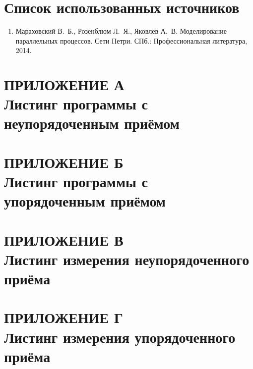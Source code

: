 \documentclass[14pt,a4paper]{extarticle}
\begin{document}
\section{Список использованных источников}

\begin{enumerate}[label=\arabic*,leftmargin=1.25cm]
    \item Мараховский В.~Б., Розенблюм Л.~Я., Яковлев А.~В.
    Моделирование параллельных процессов. Сети Петри.
    СПб.: Профессиональная литература, 2014.
\end{enumerate}

\clearpage
{}
\section*{ПРИЛОЖЕНИЕ А\\Листинг программы с неупорядоченным приёмом}


\clearpage
{}
\section*{ПРИЛОЖЕНИЕ Б\\Листинг программы с упорядоченным приёмом}


\clearpage
{}
\section*{ПРИЛОЖЕНИЕ В\\Листинг измерения неупорядоченного приёма}


\clearpage
{}
\section*{ПРИЛОЖЕНИЕ Г\\Листинг измерения упорядоченного приёма}

\end{document}
